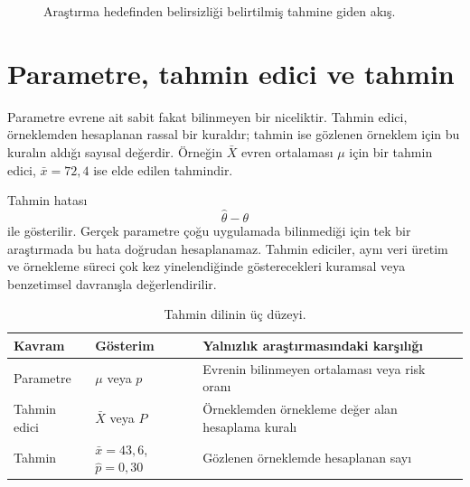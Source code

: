 \begin{figure}[htbp]
\centering
{}
\caption{Araştırma hedefinden belirsizliği belirtilmiş tahmine giden akış.}
\label{fig:nokta-tahmin-akisi}
\end{figure}

\section{Parametre, tahmin edici ve tahmin}

Parametre evrene ait sabit fakat bilinmeyen bir niceliktir. Tahmin edici,
örneklemden hesaplanan rassal bir kuraldır; tahmin ise gözlenen örneklem için
bu kuralın aldığı sayısal değerdir. Örneğin $\bar X$ evren ortalaması $\mu$
için bir tahmin edici, $\bar x=72{,}4$ ise elde edilen tahmindir.

Tahmin hatası
\[
\hat\theta-\theta
\]
ile gösterilir. Gerçek parametre çoğu uygulamada bilinmediği için tek bir
araştırmada bu hata doğrudan hesaplanamaz. Tahmin ediciler, aynı veri üretim ve
örnekleme süreci çok kez yinelendiğinde gösterecekleri kuramsal veya benzetimsel
davranışla değerlendirilir.

\begin{table}[htbp]
\centering
\caption{Tahmin dilinin üç düzeyi.}
\begin{tabular}{@{}p{}p{}p{}@{}}
\toprule
Kavram & Gösterim & Yalnızlık araştırmasındaki karşılığı \\
\midrule
Parametre & $\mu$ veya $p$ & Evrenin bilinmeyen ortalaması veya risk oranı \\
Tahmin edici & $\bar X$ veya $\hat P$ & Örneklemden örnekleme değer alan hesaplama kuralı \\
Tahmin & $\bar x=43{,}6$, $\hat p=0{,}30$ & Gözlenen örneklemde hesaplanan sayı \\
\bottomrule
\end{tabular}
\end{table}


